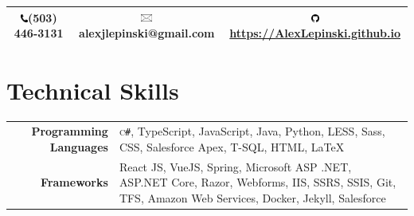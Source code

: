 \documentclass[10pt]{article}
\newcommand{\phoneicon}{\includegraphics[height=2.5mm,keepaspectratio]{phone.png}}
\newcommand{\emailicon}{\includegraphics[height=2.4mm,keepaspectratio]{emailicon.jpg}}
\newcommand{\githubicon}{\includegraphics[height=2.6mm,keepaspectratio]{githubicon.png}}
\begin{document}
\pagestyle{empty} %

\par{\par}

\begin{center}{\def\arraystretch{1.5}
\begin{tabular}{ccc}
    \hline\hline
    \phoneicon  \space (503) 446-3131 &
    \emailicon  \space alexjlepinski@gmail.com &
    \githubicon \space \url{https://AlexLepinski.github.io}\\
	\hline\hline
\end{tabular}
}\end{center}

\vspace*{-\baselineskip}
\vspace{3mm}


\vspace*{-\baselineskip}
\vspace{3mm}

\section{Technical Skills}

\begin{tabular}{rp{13.1cm}}
\textbf{\space Programming Languages}
	&  \textsc{c\texttt{\#}}, TypeScript, JavaScript,
    Java, Python, LESS, Sass, CSS,
  		Salesforce Apex, T-SQL, HTML, \LaTeX\\
\textbf{\space Frameworks}
	& React JS, VueJS, Spring, Microsoft ASP .NET, ASP.NET Core, Razor, Webforms, IIS, SSRS, SSIS, Git, TFS, Amazon Web Services, Docker, Jekyll, Salesforce \\
\end{tabular}
\vspace*{-\baselineskip}
\vspace{3mm}

\vspace*{-\baselineskip}
\vspace{3mm}
\end{document}
